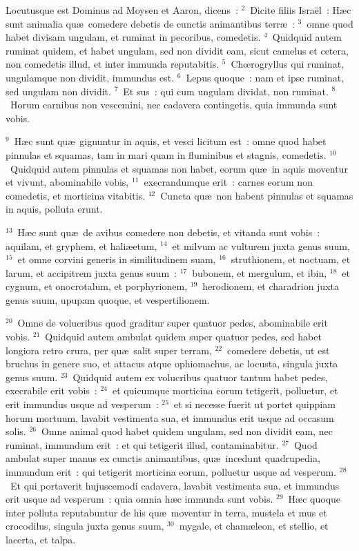 \lettrine[lines=3,image=true,loversize=0.05,lraise=-0.03]{L}{}ocutusque est Dominus ad Moysen et Aaron, dicens~:
${}^{2}$~Dicite filiis Isra\"el~: H\ae c sunt animalia qu\ae\ comedere debetis de cunctis animantibus terr\ae~:
${}^{3}$~omne quod habet divisam ungulam, et ruminat in pecoribus, comedetis.
${}^{4}$~Quidquid autem ruminat quidem, et habet ungulam, sed non dividit eam, sicut camelus et cetera, non comedetis illud, et inter immunda reputabitis.
${}^{5}$~Chœrogryllus qui ruminat, ungulamque non dividit, immundus est.
${}^{6}$~Lepus quoque~: nam et ipse ruminat, sed ungulam non dividit.
${}^{7}$~Et sus~: qui cum ungulam dividat, non ruminat.
${}^{8}$~Horum carnibus non vescemini, nec cadavera contingetis, quia immunda sunt vobis.


${}^{9}$~H\ae c sunt qu\ae\ gignuntur in aquis, et vesci licitum est~: omne quod habet pinnulas et squamas, tam in mari quam in fluminibus et stagnis, comedetis.
${}^{10}$~Quidquid autem pinnulas et squamas non habet, eorum qu\ae\ in aquis moventur et vivunt, abominabile vobis,
${}^{11}$~execrandumque erit~: carnes eorum non comedetis, et morticina vitabitis.
${}^{12}$~Cuncta qu\ae\ non habent pinnulas et squamas in aquis, polluta erunt.


${}^{13}$~H\ae c sunt qu\ae\ de avibus comedere non debetis, et vitanda sunt vobis~: aquilam, et gryphem, et hali\ae etum,
${}^{14}$~et milvum ac vulturem juxta genus suum,
${}^{15}$~et omne corvini generis in similitudinem suam,
${}^{16}$~struthionem, et noctuam, et larum, et accipitrem juxta genus suum~:
${}^{17}$~bubonem, et mergulum, et ibin,
${}^{18}$~et cygnum, et onocrotalum, et porphyrionem,
${}^{19}$~herodionem, et charadrion juxta genus suum, upupam quoque, et vespertilionem.


${}^{20}$~Omne de volucribus quod graditur super quatuor pedes, abominabile erit vobis.
${}^{21}$~Quidquid autem ambulat quidem super quatuor pedes, sed habet longiora retro crura, per qu\ae\ salit super terram,
${}^{22}$~comedere debetis, ut est bruchus in genere suo, et attacus atque ophiomachus, ac locusta, singula juxta genus suum.
${}^{23}$~Quidquid autem ex volucribus quatuor tantum habet pedes, execrabile erit vobis~:
${}^{24}$~et quicumque morticina eorum tetigerit, polluetur, et erit immundus usque ad vesperum~:
${}^{25}$~et si necesse fuerit ut portet quippiam horum mortuum, lavabit vestimenta sua, et immundus erit usque ad occasum solis.
${}^{26}$~Omne animal quod habet quidem ungulam, sed non dividit eam, nec ruminat, immundum erit~: et qui tetigerit illud, contaminabitur.
${}^{27}$~Quod ambulat super manus ex cunctis animantibus, qu\ae\ incedunt quadrupedia, immundum erit~: qui tetigerit morticina eorum, polluetur usque ad vesperum.
${}^{28}$~Et qui portaverit hujuscemodi cadavera, lavabit vestimenta sua, et immundus erit usque ad vesperum~: quia omnia h\ae c immunda sunt vobis.
${}^{29}$~H\ae c quoque inter polluta reputabuntur de his qu\ae\ moventur in terra, mustela et mus et crocodilus, singula juxta genus suum,
${}^{30}$~mygale, et cham\ae leon, et stellio, et lacerta, et talpa.


